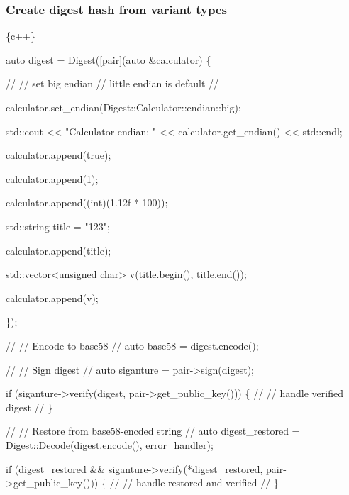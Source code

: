 \subsubsection*{Create digest hash from variant types}


\begin{DoxyCode}
\{c++\}

auto digest = Digest([pair](auto &calculator) \{

        //
        // set big endian 
        // little endian is default
        //

        calculator.set\_endian(Digest::Calculator::endian::big);

        std::cout << "Calculator endian: " << calculator.get\_endian() << std::endl;

        calculator.append(true);

        calculator.append(1);

        calculator.append((int)(1.12f * 100));

        std::string title = "123";

        calculator.append(title);

        std::vector<unsigned char> v(title.begin(), title.end());

        calculator.append(v);

    \});

//
// Encode to base58
//
auto base58 = digest.encode();

//
// Sign digest
//
auto siganture = pair->sign(digest);

if (siganture->verify(digest, pair->get\_public\_key())) \{
    //
    // handle verified digest
    //
\}

//
// Restore from base58-encded string
//
auto digest\_restored = Digest::Decode(digest.encode(), error\_handler);

if (digest\_restored && siganture->verify(*digest\_restored, pair->get\_public\_key())) \{
    //
    // handle restored and verified
    //     
\}
\end{DoxyCode}
 
